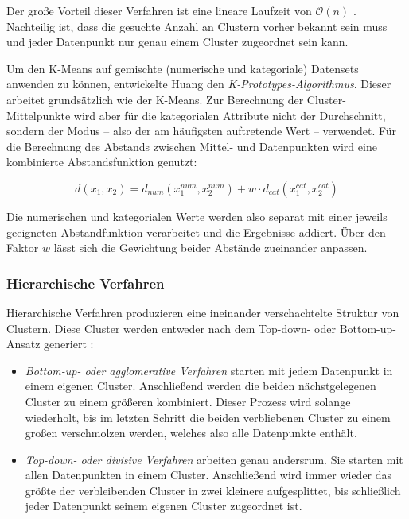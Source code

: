 Der große Vorteil dieser Verfahren ist eine lineare Laufzeit von
\(\mathcal{O}(n)\) \autocite{huang1998}. Nachteilig ist, dass die
gesuchte Anzahl an Clustern vorher bekannt sein muss und jeder
Datenpunkt nur genau einem Cluster zugeordnet sein kann. \autocite[Kap.
1.3.1 Partitioning Methods]{kaufman2009}

Um den K-Means auf gemischte (numerische und kategoriale) Datensets
anwenden zu können, entwickelte Huang \autocite{huang1998} den
\emph{K-Prototypes-Algorithmus}. Dieser arbeitet grundsätzlich wie der
K-Means. Zur Berechnung der Cluster-Mittelpunkte wird aber für die
kategorialen Attribute nicht der Durchschnitt, sondern der Modus -- also
der am häufigsten auftretende Wert -- verwendet. Für die Berechnung des
Abstands zwischen Mittel- und Datenpunkten wird eine kombinierte
Abstandsfunktion genutzt:

\begin{equation}
    d(x_1,x_2) = d_{num}(x^{num}_1,x^{num}_2) + w \cdot d_{cat}(x^{cat}_1,x^{cat}_2)
\end{equation}

Die numerischen und kategorialen Werte werden also separat mit einer
jeweils geeigneten Abstandfunktion verarbeitet und die Ergebnisse
addiert. Über den Faktor \(w\) lässt sich die Gewichtung beider Abstände
zueinander anpassen. \autocite{huang1998}

\hypertarget{hierarchische-verfahren}{%
\subsubsection{Hierarchische Verfahren}\label{hierarchische-verfahren}}

Hierarchische Verfahren produzieren eine ineinander verschachtelte
Struktur von Clustern. Diese Cluster werden entweder nach dem Top-down-
oder Bottom-up-Ansatz generiert \autocite[Kap. 1.3.2 Hierarchical
Methods]{kaufman2009}:

\begin{itemize}
\tightlist
\item
  \emph{Bottom-up- oder agglomerative Verfahren} starten mit jedem
  Datenpunkt in einem eigenen Cluster. Anschließend werden die beiden
  nächstgelegenen Cluster zu einem größeren kombiniert. Dieser Prozess
  wird solange wiederholt, bis im letzten Schritt die beiden
  verbliebenen Cluster zu einem großen verschmolzen werden, welches also
  alle Datenpunkte enthält.
\item
  \emph{Top-down- oder divisive Verfahren} arbeiten genau andersrum. Sie
  starten mit allen Datenpunkten in einem Cluster. Anschließend wird
  immer wieder das größte der verbleibenden Cluster in zwei kleinere
  aufgesplittet, bis schließlich jeder Datenpunkt seinem eigenen Cluster
  zugeordnet ist.
\end{itemize}

